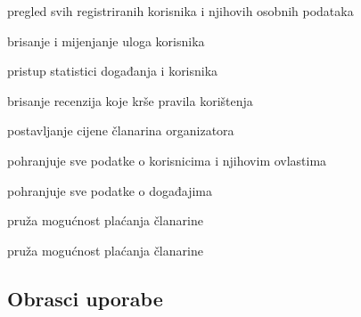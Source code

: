 \begin{packed_enum}
\begin{packed_enum}
					\item  pregled svih registriranih korisnika i njihovih osobnih podataka
					\item  brisanje i mijenjanje uloga korisnika
					\item  pristup statistici događanja i korisnika
					\item  brisanje recenzija koje krše pravila korištenja
					\item  postavljanje cijene članarina organizatora
					
				\end{packed_enum}
			
				\item  {}
				
				\begin{packed_enum}
					
					\item pohranjuje sve podatke o korisnicima i njihovim ovlastima
					\item pohranjuje sve podatke o događajima
					
				\end{packed_enum}
				
				\item  {}
				
				\begin{packed_enum}
					
					\item pruža mogućnost plaćanja članarine
					
				\end{packed_enum}
				
				\item  {}
				
				\begin{packed_enum}
					
					\item pruža mogućnost plaćanja članarine
					
				\end{packed_enum}
			\end{packed_enum}
			
			\eject 
			
			
				
			\subsection{Obrasci uporabe}
				
